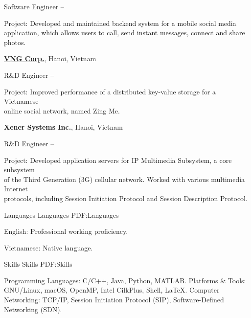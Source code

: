 \documentclass[letterpaper,MMMyyyy,nonstopmode]{simpleresumecv}
\begin{document}
\begin{Body}
\Gap
\BulletItem
Software Engineer
\hfill
{} -- 
\begin{Detail}
\SubBulletItem
Project: Developed and maintained backend system for a mobile social media \\
application, which allows users to call, send instant messages, connect and share photos. 
\end{Detail}

\BigGap

\Entry
\href{https://www.vng.com.vn/en/index.html}
{\textbf{VNG Corp.}}, Hanoi, Vietnam

\Gap
\BulletItem
R\&D Engineer
\hfill
{} -- 
\begin{Detail}
\SubBulletItem
Project: Improved performance of a distributed key-value storage for a Vietnamese \\
online social network, named Zing Me. 
\end{Detail}

\BigGap

\Entry
{\textbf{Xener Systems Inc.}}, Hanoi, Vietnam

\Gap
\BulletItem
R\&D Engineer
\hfill
{} -- 
\begin{Detail}
\SubBulletItem
Project: Developed application servers for IP Multimedia Subsystem, a core subsystem \\
of the Third Generation (3G) cellular network. Worked with various multimedia Internet \\
protocols, including Session Initiation Protocol and Session Description Protocol. 
\end{Detail}


\Section
{Languages}
{Languages}
{PDF:Languages}

\BulletItem
English: Professional working proficiency.

\Gap
\BulletItem
Vietnamese: Native language.



\Section
{Skills}
{Skills}
{PDF:Skills}

\Entry
\BulletItem
Programming Languages: C/C++, Java, Python, MATLAB.
\BulletItem
Platforms \& Tools: GNU/Linux, macOS, OpenMP, Intel CilkPlus, Shell, {\LaTeX}.
\BulletItem
Computer Networking: TCP/IP, Session Initiation Protocol (SIP), 
Software-Defined Networking (SDN).


\end{Body}
\end{document}
